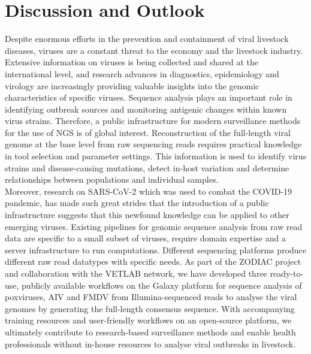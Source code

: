 \chapter{Discussion and Outlook}\label{chap:discussion}
Despite enormous efforts in the prevention and containment of viral livestock diseases, viruses are a constant threat to the economy and the livestock industry. Extensive information on viruses is being collected and shared at the international level, and research advances in diagnostics, epidemiology and virology are increasingly providing valuable insights into the genomic characteristics of specific viruses. Sequence analysis plays an important role in identifying outbreak sources and monitoring antigenic changes within known virus strains. Therefore, a public infrastructure for modern surveillance methods for the use of \ac{NGS} is of global interest. Reconstruction of the full-length viral genome at the base level from raw sequencing reads requires practical knowledge in tool selection and parameter settings. This information is used to identify virus strains and disease-causing mutations, detect in-host variation and determine relationships between populations and individual samples.\\
Moreover, research on \ac{SARS-CoV-2} which was used to combat the \ac{COVID-19} pandemic, has made such great strides that the introduction of a public infrastructure suggests that this newfound knowledge can be applied to other emerging viruses. Existing pipelines for genomic sequence analysis from raw read data are specific to a small subset of viruses, require domain expertise and a server infrastructure to run computations. Different sequencing platforms produce different raw read datatypes with specific needs. As part of the \ac{ZODIAC} project and collaboration with the \ac{VETLAB} network, we have developed three ready-to-use, publicly available workflows on the Galaxy platform for sequence analysis of poxviruses, \ac{AIV} and \ac{FMDV} from Illumina-sequenced reads to analyse the viral genomes by generating the full-length consensus sequence. With accompanying training resources and user-friendly workflows on an open-source platform, we ultimately contribute to research-based surveillance methods and enable health professionals without in-house resources to analyse viral outbreaks in livestock.

